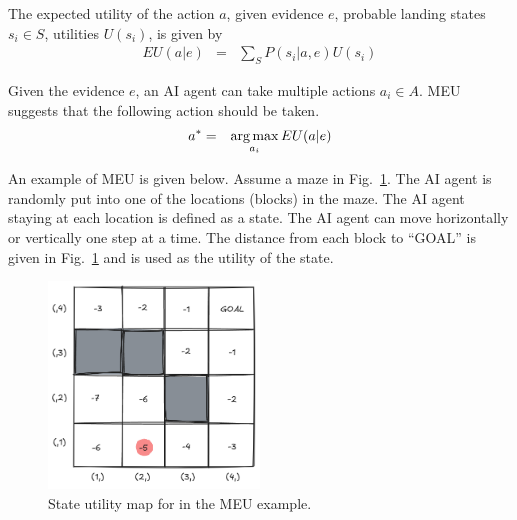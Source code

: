 The expected utility of the action $a$, given evidence $e$, probable landing states $s_i\in S$, utilities $U(s_i)$, is given by
\begin{eqnarray}
EU(a|e) &=& \sum_{S} P(s_i|a,e) U(s_i) \label{eq:expected_utility}
\end{eqnarray}

Given the evidence $e$, an AI agent can take multiple actions $a_i \in A$. MEU suggests that the following action should be taken.
\begin{eqnarray}
	a^* &=& \operatorname*{arg\,max}_{a_i} EU(a|e) \label{eq:emu}
\end{eqnarray}

An example of MEU is given below. Assume a maze in Fig.~\ref{fig:emuexp}. The AI agent is randomly put into one of the locations (blocks) in the maze. The AI agent staying at each location is defined as a state. The AI agent can move horizontally or vertically one step at a time. The distance from each block to ``GOAL'' is given in Fig.~\ref{fig:emuexp} and is used as the utility of the state.

\begin{figure}[!htb]
	\centering
	\includegraphics[width=0.5\textwidth]{./chapters/part-1/figures/emuexp.png}
	\caption{State utility map for in the MEU example.}
	\label{fig:emuexp}
\end{figure}

